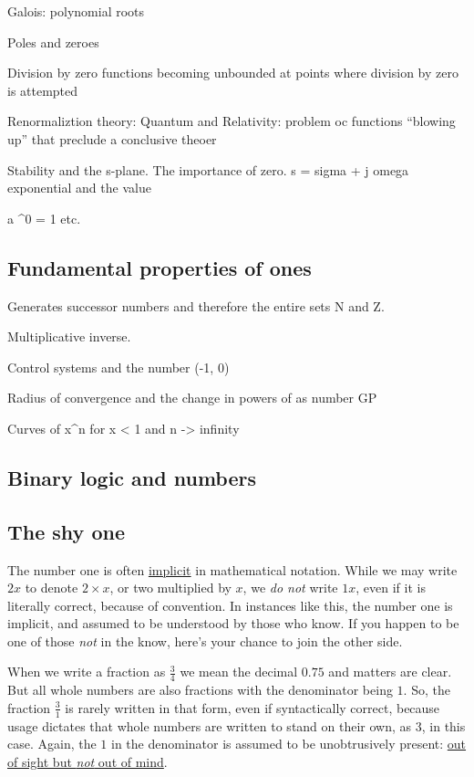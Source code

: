 \documentclass[
  a4paper,
]{article}
\begin{document}
Galois: polynomial roots

Poles and zeroes

Division by zero functions becoming unbounded at points where division
by zero is attempted

Renormaliztion theory: Quantum and Relativity: problem oc functions
``blowing up'' that preclude a conclusive theoer

Stability and the s-plane. The importance of zero. s = sigma + j omega
exponential and the value

a \^{}0 = 1 etc.

\hypertarget{fundamental-properties-of-ones}{%
\subsection{Fundamental properties of
ones}\label{fundamental-properties-of-ones}}

Generates successor numbers and therefore the entire sets N and Z.

Multiplicative inverse.

Control systems and the number (-1, 0)

Radius of convergence and the change in powers of as number GP

Curves of x\^{}n for x \textless{} 1 and n -\textgreater{} infinity

\hypertarget{binary-logic-and-numbers}{%
\subsection{Binary logic and numbers}\label{binary-logic-and-numbers}}

\hypertarget{the-shy-one}{%
\subsection{The shy one}\label{the-shy-one}}

The number one is often
\href{https://www.vocabulary.com/dictionary/implicit}{implicit} in
mathematical notation. While we may write \(2x\) to denote
\(2\times x\), or two multiplied by \(x\), we \emph{do not} write
\(1x\), even if it is literally correct, because of convention. In
instances like this, the number one is implicit, and assumed to be
understood by those who know. If you happen to be one of those
\emph{not} in the know, here's your chance to join the other side.

When we write a fraction as \(\frac{3}{4}\) we mean the decimal \(0.75\)
and matters are clear. But all whole numbers are also fractions with the
denominator being \(1\). So, the fraction \(\frac{3}{1}\) is rarely
written in that form, even if syntactically correct, because usage
dictates that whole numbers are written to stand on their own, as \(3\),
in this case. Again, the \(1\) in the denominator is assumed to be
unobtrusively present:
\href{https://dictionary.cambridge.org/dictionary/english/out-of-sight-out-of-mind}{out
of sight but \emph{not} out of mind}.
\end{document}
